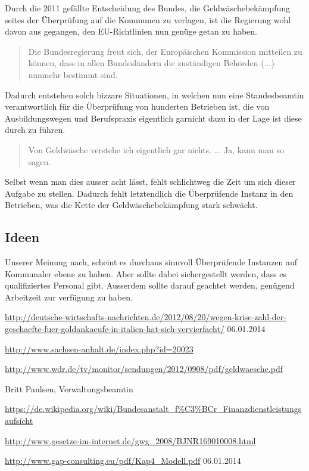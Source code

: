 \documentclass{article}
\begin{document}
            Durch die 2011 gefällte Entscheidung des Bundes, die Geldwäschebekämpfung seites der Überprüfung auf die Kommunen zu verlagen, ist die Regierung wohl davon aus gegangen, den EU-Richtlinien nun genüge getan zu haben.
            \begin{quote} Die Bundesregierung freut sich, der Europäischen Kommission mitteilen zu können, dass in allen Bundesländern die zuständigen Behörden (...) nunmehr bestimmt sind. \cite{EUZeugs} \end{quote}
            Dadurch entstehen solch bizzare Situationen, in welchen nun eine Standesbeamtin verantwortlich für die Überprüfung von hunderten Betrieben ist, die von Ausbildungswegen und Berufspraxis eigentlich garnicht dazu in der Lage ist diese durch zu führen. \begin{quote} Von Geldwäsche verstehe ich eigentlich gar nichts. ... Ja, kann man so sagen. \cite{Beatmin} \end{quote} Selbst wenn man dies ausser acht lässt, fehlt schlichtweg die Zeit um sich dieser Aufgabe zu stellen. Dadurch fehlt letztendlich die Überprüfende Instanz in den Betrieben, was die Kette der Geldwäschebekämpfung stark schwächt.

        \subsection[Ideen]{Ideen}

            Unserer Meinung nach, scheint es durchaus sinnvoll Überprüfende Instanzen auf Kommunaler ebene zu haben. Aber sollte dabei sichergestellt werden, dass es qualifiziertes Personal gibt. Ausserdem sollte darauf geachtet werden, genügend Arbeitzeit zur verfügung zu haben.

\newpage

    \begin{thebibliography}{9}

         \url{http://deutsche-wirtschafts-nachrichten.de/2012/08/20/wegen-krise-zahl-der-geschaefte-fuer-goldankaeufe-in-italien-hat-sich-vervierfacht/}
        06.01.2014

         \url{http://www.sachsen-anhalt.de/index.php?id=20023}

         \url{http://www.wdr.de/tv/monitor/sendungen/2012/0908/pdf/geldwaesche.pdf}

         Britt Paulsen, Verwaltungsbeamtin

         \url{https://de.wikipedia.org/wiki/Bundesanstalt_f%C3%BCr_Finanzdienstleistungsaufsicht}

         \url{http://www.gesetze-im-internet.de/gwg_2008/BJNR169010008.html}

         \url{http://www.gap-consulting.eu/pdf/Kap4_Modell.pdf}
        06.01.2014
        
    \end{thebibliography}
\end{document}
